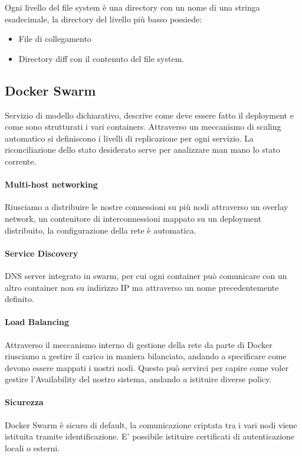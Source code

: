 \documentclass{article}
\begin{document}
		Ogni livello del file system è una directory con un nome di una stringa esadecimale, la directory del livello più basso possiede:
		\begin{itemize}
		    \item File di collegamento
		    \item Directory diff con il contenuto del file system.
		\end{itemize}
		
		\subsection{Docker Swarm}
		Servizio di modello dichiarativo, descrive come deve essere fatto il deployment e come sono strutturati i vari containers.
		Attraverso un meccanismo di scaling automatico si definiscono i livelli di replicazione per ogni servizio.
		La riconciliazione dello stato desiderato serve per analizzare man mano lo stato corrente.\\
		
		\paragraph{Multi-host networking}
		Riusciamo a distribuire le nostre connessioni su più nodi attraverso un overlay network, un contenitore di interconnessioni mappato su un deployment distribuito, la configurazione della rete è automatica.\newline
		
		\paragraph{Service Discovery}
		DNS server integrato in swarm, per cui ogni container può comunicare con un altro container non su indirizzo IP ma attraverso un nome precedentemente definito.\newline
		
		\paragraph{Load Balancing}
		Attraverso il meccanismo interno di gestione della rete da parte di Docker riusciamo a gestire il carico in maniera bilanciato, andando a specificare come devono essere mappati i nostri nodi. Questo può servirci per capire come voler gestire l'Availability del nostro sistema, andando a istituire diverse policy.\newline
		
		\paragraph{Sicurezza}
		Docker Swarm è sicuro di default, la comunicazione criptata tra i vari nodi viene istituita tramite identificazione. E' possibile istituire certificati di autenticazione locali o esterni. \newline
		
\end{document}
